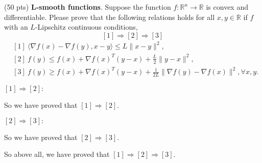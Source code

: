 \item {\color{red} (50 pts)} \textbf{L-smooth functions}. Suppose the function $f: \mathbb{R}^n \rightarrow \mathbb{R}$ is convex and differentiable. Please prove that the following relations holds for all $x, y \in \mathbb{R}$ if $f$ with an $L$-Lipschitz continuous conditions,
$$[1] \Rightarrow[2] \Rightarrow[3]$$
\begin{align*}
    & [1]\  \langle\nabla f(x)-\nabla f(y), x-y\rangle \leq L\|x-y\|^2,\\
    & [2]\  f(y) \leq f(x)+\nabla f(x)^T(y-x)+\frac{L}{2}\|y-x\|^2,\\
    & [3]\  f(y) \geq f(x)+\nabla f(x)^T(y-x)+\frac{1}{2 L}\|\nabla f(y)-\nabla f(x)\|^2, \forall x, y.
\end{align*}

\solution{}
$[1] \Rightarrow[2]:$













So we have proved that $[1] \Rightarrow[2]$.

$[2] \Rightarrow[3]:$







So we have proved that $[2] \Rightarrow[3]$.

So above all, we have proved that $[1] \Rightarrow[2] \Rightarrow[3]$.

\newpage